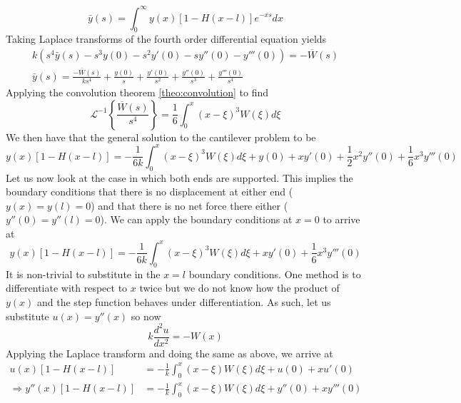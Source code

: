 \documentclass{report}
\theoremstyle{definition}
\theoremstyle{remark}
\newcommand{\inlt}[1]{\mathscr{L}^{-1} \left\{ #1 \right\}}
\newcommand{\odt}[2]{\frac{d^2 #1}{d#2^2}}
\begin{document}
\begin{equation*}
    \bar{y}(s) = \int^\infty_0y(x)[1-H(x-l)]e^{-xs}dx
\end{equation*}
Taking Laplace transforms of the fourth order differential equation yields 
\begin{equation*}
    \begin{split}
        k(s^4\bar y(s) -s^3 y(0) -s^2y'(0) -sy''(0) - y'''(0)) = -\overline W(s)\\ \bar y(s) = \frac{-\overline W (s)}{ks^4}+\frac{y(0)}{s}+\frac{y'(0)}{s^2}+\frac{y''(0)}{s^3} + \frac{y'''(0)}{s^4}
    \end{split}
\end{equation*}
Applying the convolution theorem \ref{theo:convolution} to find 
\begin{equation*}
    \inlt{\frac{\overline W (s)}{s^4}} = \frac{1}{6}\int^x_0(x-\xi)^3W(\xi)d\xi
\end{equation*}
We then have that the general solution to the cantilever problem to be 
\begin{equation*}
    y(x)[1-H(x-l)] = -\frac{1}{6k}\int^x_0(x-\xi)^3W(\xi)d\xi +y(0) + xy'(0)+\frac{1}{2}x^2y''(0)+\frac{1}{6}x^3y'''(0)
\end{equation*}
Let us now look at the case in which both ends are supported. This implies the boundary conditions that there is no displacement at either end ($y(x)=y(l)=0$) and that there is no net force there either ($y''(0)=y''(l)=0$). We can apply the boundary conditions at $x=0$ to arrive at 
\begin{equation*}
    y(x)[1-H(x-l)] = -\frac{1}{6k}\int^x_0(x-\xi)^3W(\xi)d\xi + xy'(0)+\frac{1}{6}x^3y'''(0)
\end{equation*}
It is non-trivial to substitute in the $x=l$ boundary conditions. One method is to differentiate with respect to $x$ twice but we do not know how the product of $y(x)$ and the step function behaves under differentiation. As such, let us substitute $u(x)=y''(x)$ so now 
\begin{equation*}
    k\odt{u}{x} = - W(x)
\end{equation*}
Applying the Laplace transform and doing the same as above, we arrive at 
\begin{equation*}
    \begin{split}
        u(x)[1-H(x-l)] &= -\frac{1}{k}\int^x_0(x-\xi)W(\xi)d\xi + u(0)+xu'(0) \\
        \Rightarrow  y''(x)[1-H(x-l)] &= -\frac{1}{k}\int^x_0(x-\xi)W(\xi)d\xi + y''(0)+xy'''(0)
    \end{split}
\end{equation*}
\end{document}
